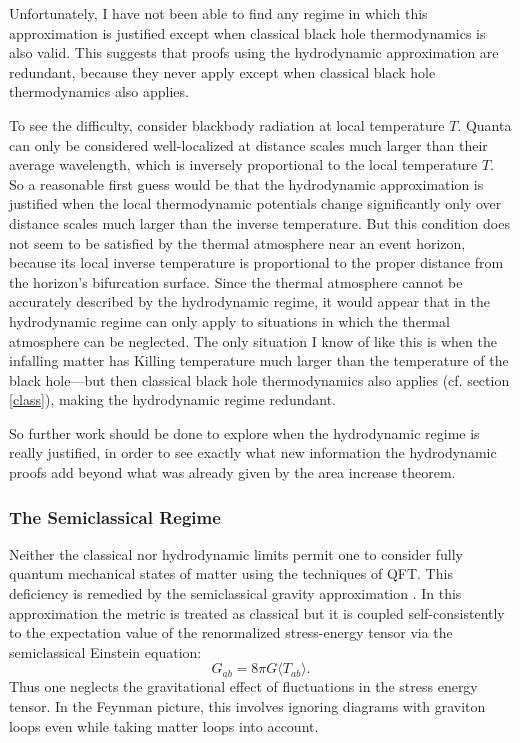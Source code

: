 \documentclass{article}
\begin{document}
Unfortunately, I have not been able to find any regime in which this approximation is justified except when classical black hole thermodynamics is also valid.  This suggests that proofs using the hydrodynamic approximation are redundant, because they never apply except when classical black hole thermodynamics also applies.

To see the difficulty, consider blackbody radiation at local temperature $T$.  Quanta can only be considered well-localized at distance scales much larger than their average wavelength, which is inversely proportional to the local temperature $T$.  So a reasonable first guess would be that the hydrodynamic approximation is justified when the local thermodynamic potentials change significantly only over distance scales much larger than the inverse temperature.  But this condition does not seem to be satisfied by the thermal atmosphere near an event horizon, because its local inverse temperature is proportional to the proper distance from the horizon's bifurcation surface.  Since the thermal atmosphere cannot be accurately described by the hydrodynamic regime, it would appear that in the hydrodynamic regime can only apply to situations in which the thermal atmosphere can be neglected.  The only situation I know of like this is when the infalling matter has Killing temperature much larger than the temperature of the black hole---but then classical black hole thermodynamics also applies (cf. section \ref{class}), making the hydrodynamic regime redundant.

So further work should be done to explore when the hydrodynamic regime is really justified, in order to see exactly what new information the hydrodynamic proofs add beyond what was already given by the area increase theorem.

\subsubsection{The Semiclassical Regime}\label{SC}

Neither the classical nor hydrodynamic limits permit one to consider fully quantum mechanical states of matter using the techniques of QFT.  This deficiency is remedied by the semiclassical gravity approximation \cite{bardeen81}.  In this approximation the metric is treated as classical but it is coupled self-consistently to the expectation value of the renormalized stress-energy tensor via the semiclassical Einstein equation:
\begin{equation}\label{semiEin}
G_{ab} = 8\pi G \langle T_{ab} \rangle.
\end{equation}
Thus one neglects the gravitational effect of fluctuations in the stress energy tensor.  In the Feynman picture, this involves ignoring diagrams with graviton loops even while taking matter loops into account.
\end{document}
